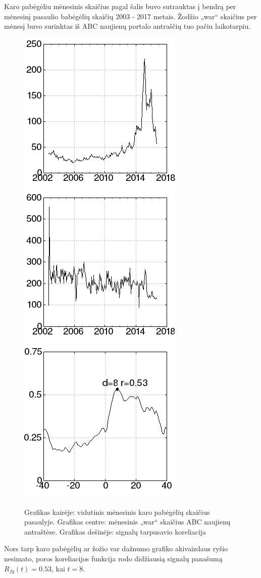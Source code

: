 Karo pabėgėliu mėnesinis skaičius pagal šalis\cite{refugees} buvo sutrauktas į bendrą per mėnesinį pasaulio babėgėlių skaičių 2003 - 2017 metais.
Žodžio „war“ skaičius per mėnesį buvo surinktas iš ABC naujienų portalo antraščių\cite{abcNews} tuo pačiu laikotarpiu.

\begin{figure}
\includegraphics[scale=0.65]{../scripts/refugees_war/refugees.png}
\includegraphics[scale=0.65]{../scripts/refugees_war/war.png}
\includegraphics[scale=0.65]{../scripts/refugees_war/result.png}
    \caption{Grafikas kairėje: vidutinis mėnesinis karo pabėgėlių skaičius pasaulyje. Grafikas centre: mėnesinis „war“ skaičius ABC naujienų antraštėse. Grafikas dešinėje: signalų tarpusavio koreliacija}
\end{figure}

Nors tarp karo pabėgėlių ar žožio var dažnumo grafiko akivaizdaus ryšio nesimato,
poros koreliacijos funkcija rodo didžiausią signalų panašumą \( R_{fg}(t) = 0.53 \), kai \( t = 8 \).
